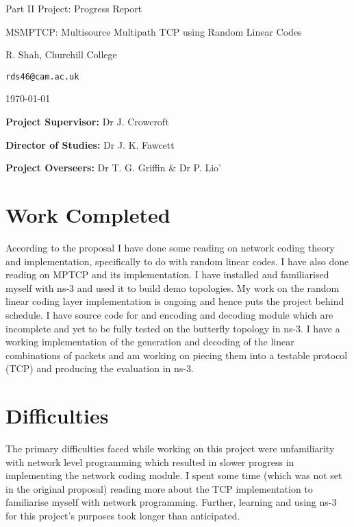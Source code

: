 \documentclass[12pt,a4paper,twoside]{article}
\begin{document}
\vfil

\centerline{\Large Part II Project: Progress Report}
\vspace{0.4in}
\centerline{\Large MSMPTCP: Multisource Multipath TCP using Random Linear Codes}
\vspace{0.4in}
\centerline{\large R. Shah, Churchill College}
\vspace{0.3in}
\centerline{\large \texttt{rds46@cam.ac.uk}}
\vspace{0.3in}
\centerline{\large \today}

\vfil

\noindent
{\bf Project Supervisor:} Dr J. Crowcroft
\vspace{0.2in}

\noindent
{\bf Director of Studies:} Dr J. K. Fawcett
\vspace{0.2in}
\noindent
 
\noindent
{\bf Project Overseers:} Dr T. G. Griffin  \& Dr P. Lio'

\section*{Work Completed}

According to the proposal I have done some reading on network coding theory and implementation, specifically to do with random linear codes. I have also done reading on MPTCP and its implementation. I have installed and familiarised myself with ns-3 and used it to build demo topologies. My work on the random linear coding layer implementation is ongoing and hence puts the project behind schedule. I have source code for and encoding and decoding module which are incomplete and yet to be fully tested on the butterfly topology in ns-3. I have a working implementation of the generation and decoding of the linear combinations of packets and am working on piecing them into a testable protocol (TCP) and producing the evaluation in ns-3.

\section*{Difficulties}

The primary difficulties faced while working on this project were unfamiliarity with network level programming which resulted in slower progress in implementing the network coding module. I spent some time (which was not set in the original proposal) reading more about the TCP implementation to familiarise myself with network programming. Further, learning and using ns-3 for this project's purposes took longer than anticipated. 
\end{document}
